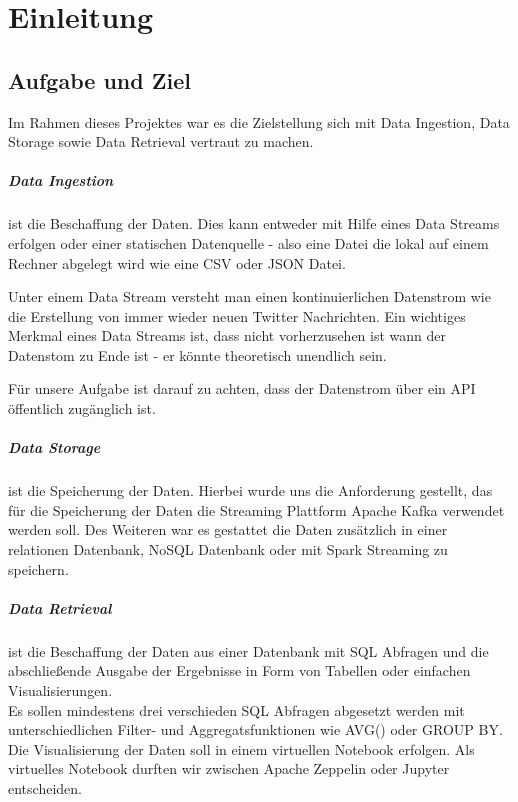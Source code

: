 \chapter{Einleitung}
\label{chap:einleitung}

\section{Aufgabe und Ziel}
Im Rahmen dieses Projektes war es die Zielstellung sich mit Data Ingestion, Data Storage sowie Data Retrieval vertraut zu machen.
\paragraph{Data Ingestion} ist die Beschaffung der Daten.
Dies kann entweder mit Hilfe eines Data Streams erfolgen oder einer statischen Datenquelle - also eine Datei die lokal
auf einem Rechner abgelegt wird wie \zb{} eine \ac{CSV} oder \ac{JSON} Datei.

Unter einem Data Stream versteht man einen kontinuierlichen Datenstrom wie \zb{}
die Erstellung von immer wieder neuen Twitter Nachrichten.
Ein wichtiges Merkmal eines Data Streams ist, dass nicht vorherzusehen ist wann der Datenstom zu Ende ist - er könnte theoretisch unendlich sein.

Für unsere Aufgabe ist darauf zu achten, dass der Datenstrom über ein \ac{API} öffentlich zugänglich ist.

\paragraph{Data Storage} ist die Speicherung der Daten.
Hierbei wurde uns die Anforderung gestellt, das für die Speicherung der Daten die Streaming Plattform Apache Kafka verwendet werden soll.
Des Weiteren war es gestattet die Daten zusätzlich in einer relationen Datenbank, NoSQL Datenbank oder mit Spark Streaming zu speichern.

\paragraph{Data Retrieval} ist die Beschaffung der Daten aus einer Datenbank mit \ac{SQL} Abfragen und die abschließende Ausgabe
der Ergebnisse in Form von Tabellen oder einfachen Visualisierungen. \\
Es sollen mindestens drei verschieden \ac{SQL} Abfragen abgesetzt werden mit unterschiedlichen Filter- und Aggregatsfunktionen wie \zb{} AVG() oder GROUP BY. Die Visualisierung der Daten soll in einem virtuellen Notebook erfolgen. Als virtuelles Notebook durften wir zwischen Apache Zeppelin oder Jupyter entscheiden.

